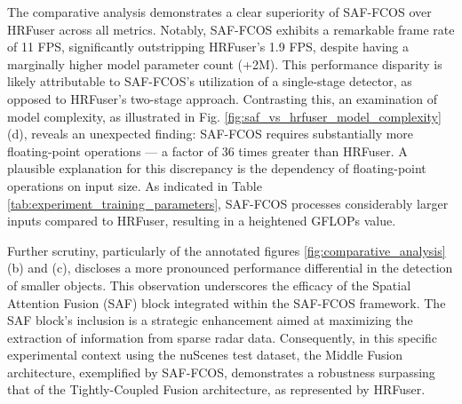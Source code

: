 \documentclass[report.tex]{subfiles}
\begin{document}


    The comparative analysis demonstrates a clear superiority of SAF-FCOS over HRFuser across all metrics. Notably, SAF-FCOS exhibits a remarkable frame rate of 11 FPS, significantly outstripping HRFuser's 1.9 FPS, despite having a marginally higher model parameter count (+2M). This performance disparity is likely attributable to SAF-FCOS's utilization of a single-stage detector, as opposed to HRFuser's two-stage approach. Contrasting this, an examination of model complexity, as illustrated in Fig. \ref{fig:saf_vs_hrfuser_model_complexity} (d), reveals an unexpected finding: SAF-FCOS requires substantially more floating-point operations — a factor of 36 times greater than HRFuser. A plausible explanation for this discrepancy is the dependency of floating-point operations on input size. As indicated in Table \ref{tab:experiment_training_parameters}, SAF-FCOS processes considerably larger inputs compared to HRFuser, resulting in a heightened GFLOPs value.

    Further scrutiny, particularly of the annotated figures \ref{fig:comparative_analysis} (b) and (c), discloses a more pronounced performance differential in the detection of smaller objects. This observation underscores the efficacy of the Spatial Attention Fusion (SAF) block integrated within the SAF-FCOS framework. The SAF block's inclusion is a strategic enhancement aimed at maximizing the extraction of information from sparse radar data. Consequently, in this specific experimental context using the nuScenes test dataset, the Middle Fusion architecture, exemplified by SAF-FCOS, demonstrates a robustness surpassing that of the Tightly-Coupled Fusion architecture, as represented by HRFuser.
\end{document}
